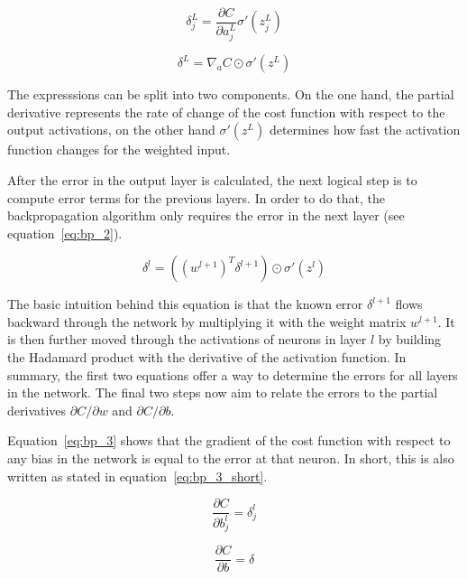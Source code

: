 \begin{equation}
  \label{eq:bp_1_comp}
  \delta_j^L = \frac{\partial C}{\partial a_j^L} \sigma'(z_j^L)
\end{equation}

\begin{equation}
  \label{eq:bp_1_mat}
  \delta^L = \nabla_a C \odot \sigma'(z^L)
\end{equation}

The expresssions can be split into two components. On the one hand, the partial
derivative represents the rate of change of the cost function with respect to
the output activations, on the other hand $\sigma'(z^L)$ determines how
fast the activation function changes for the weighted input.

After the error in the output layer is calculated, the next logical step is to
compute error terms for the previous layers.
In order to do that, the backpropagation algorithm only requires the error in
the next layer (see equation~\ref{eq:bp_2}).

\begin{equation}
  \label{eq:bp_2}
  \delta^l = ({(w^{l+1})}^T \delta^{l+1}) \odot \sigma'(z^l)
\end{equation}

The basic intuition behind this equation is that the known error $\delta^{l+1}$
flows backward through the network by multiplying it with the weight
matrix $w^{l+1}$.
It is then further moved through the activations of neurons in layer $l$ by
building the Hadamard product with the derivative of the activation function.
In summary, the first two equations offer a way to determine the errors for all
layers in the network.
The final two steps now aim to relate the errors to the partial derivatives
$\partial C / \partial w$ and $\partial C / \partial b$.

Equation~\ref{eq:bp_3} shows that the gradient of the cost function with respect
to any bias in the network is equal to the error at that neuron.
In short, this is also written as stated in equation~\ref{eq:bp_3_short}.

\begin{equation}
  \label{eq:bp_3}
  \frac{\partial C}{\partial b_j^l} = \delta_j^l
\end{equation}

\begin{equation}
  \label{eq:bp_3_short}
  \frac{\partial C}{\partial b} = \delta
\end{equation}

